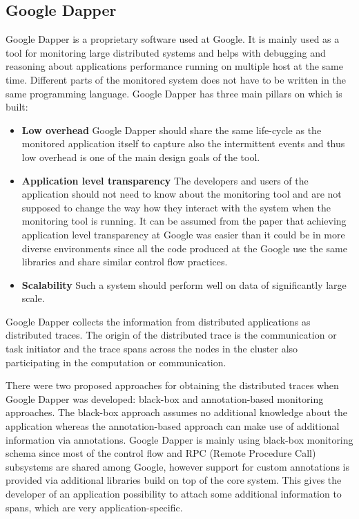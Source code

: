 \subsection{Google Dapper}
\label{dapper}
Google Dapper is a proprietary software used at Google. It is mainly used as a tool for monitoring large distributed systems and helps with debugging and reasoning about applications performance running on multiple host at the same time. Different parts of the monitored system does not have to be written in the same programming language. Google Dapper has three main pillars on which is built:
\begin{itemize}
	\item \textbf{Low overhead} \newline
	Google Dapper should share the same life-cycle as the monitored application itself to capture also the intermittent events and thus low overhead is one of the main design goals of the tool.
	\item \textbf{Application level transparency} \newline
	The developers and users of the application should not need to know about the monitoring tool and are not supposed to change the way how they interact with the system when the monitoring tool is running. It can be assumed from the paper that achieving application level transparency at Google was easier than it could be in more diverse environments since all the code produced at the Google use the same libraries and share similar control flow practices.
	\item \textbf{Scalability} \newline
	Such a system should perform well on data of significantly large scale.
\end{itemize}	
Google Dapper collects the information from distributed applications as distributed traces. The origin of the distributed trace is the communication or task initiator and the trace spans across the nodes in the cluster also participating in the computation or communication.
	
There were two proposed approaches for obtaining the distributed traces when Google Dapper was developed: black-box and annotation-based monitoring approaches. The black-box approach assumes no additional knowledge about the application whereas the annotation-based approach can make use of additional information via annotations. Google Dapper is mainly using black-box monitoring schema since most of the control flow and RPC (Remote Procedure Call) subsystems are shared among Google, however support for custom annotations is provided via additional libraries build on top of the core system. This gives the developer of an application possibility to attach some additional information to spans, which are very application-specific.
	
